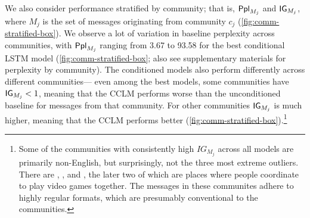 \documentclass[11pt]{article}
\begin{document}
We also consider performance stratified by community; that is,
$\mathsf{Ppl}_{M_j}$ and $\mathsf{IG}_{M_j}$, 
where $M_j$ is the set of messages originating from community $c_j$ 
(\cref{fig:comm-stratified-box}).
We observe a lot of variation in baseline perplexity
across communities, with $\mathsf{Ppl}_{M_j}$ ranging from \num{3.67} to
\num{93.58} for the best conditional LSTM model 
(\cref{fig:comm-stratified-box}; also see supplementary materials for perplexity by community). %
The conditioned models also perform differently across different communities---%
even among the best models, some communities have $\mathsf{IG}_{M_j} < 1$,
meaning that the CCLM performs worse than the unconditioned baseline for 
messages from that community.
For other communities $\mathsf{IG}_{M_j}$ is much higher, meaning that the CCLM performs better  
(\cref{fig:comm-stratified-box}).\footnote{
  Some of the communities with consistently high $IG_{M_j}$ 
  across all models are primarily non-English, 
  but surprisingly, not the three most extreme
  outliers. There are , , and , 
  the later two of which are places where people coordinate to play video games
  together. The messages in these communites adhere to highly regular formats, 
  which are presumably conventional to the communities.}
%
\end{document}
